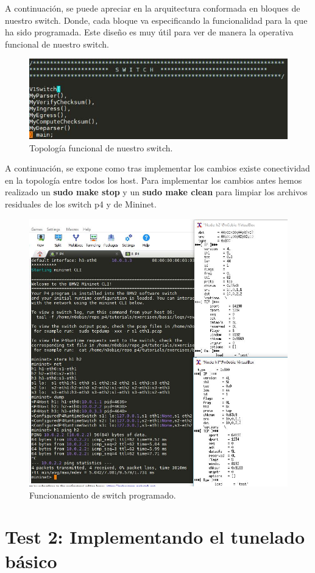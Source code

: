 A continuación, se puede apreciar en la arquitectura conformada en bloques de nuestro switch. Donde, cada bloque va especificando la funcionalidad para la que ha sido programada. Este diseño es muy útil para ver de manera la operativa funcional de nuestro switch.
\newline
\newline
\begin{figure}[!htb]
  \centering
    \includegraphics[width=0.8\linewidth]{./img/test/6.JPG}
    \caption{Topología funcional de nuestro switch.}
  \label{fig:yo}
\end{figure}
\newpage
A continuación, se expone como tras implementar los cambios existe conectividad en la topología entre todos los host. Para implementar los cambios antes hemos realizado un \textbf{sudo make stop} y un \textbf{sudo make clean} para limpiar los archivos residuales de los switch p4 y de Mininet.
\begin{figure}[!htb]
  \centering
    \includegraphics[width=\linewidth]{./img/test/7.JPG}
    \caption{Funcionamiento de switch programado.}
  \label{fig:yo}
\end{figure}
\newpage
\section{Test 2: Implementando el tunelado básico}